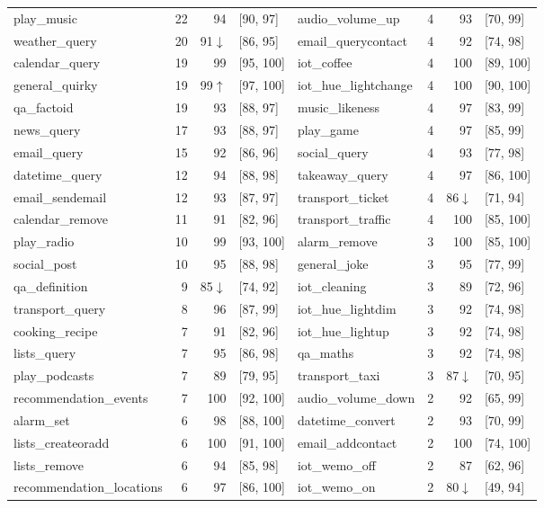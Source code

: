 \begin{tabular}{lrrl|lrrl}
play\_music & 22 & 94 & [90, 97] & audio\_volume\_up & 4 & 93 & [70, 99] \\
weather\_query & 20 & 91$\downarrow$ & [86, 95] & email\_querycontact & 4 & 92 & [74, 98] \\
calendar\_query & 19 & 99 & [95, 100] & iot\_coffee & 4 & 100 & [89, 100] \\
general\_quirky & 19 & 99$\uparrow$ & [97, 100] & iot\_hue\_lightchange & 4 & 100 & [90, 100] \\
qa\_factoid & 19 & 93 & [88, 97] & music\_likeness & 4 & 97 & [83, 99] \\
news\_query & 17 & 93 & [88, 97] & play\_game & 4 & 97 & [85, 99] \\
email\_query & 15 & 92 & [86, 96] & social\_query & 4 & 93 & [77, 98] \\
datetime\_query & 12 & 94 & [88, 98] & takeaway\_query & 4 & 97 & [86, 100] \\
email\_sendemail & 12 & 93 & [87, 97] & transport\_ticket & 4 & 86$\downarrow$ & [71, 94] \\
calendar\_remove & 11 & 91 & [82, 96] & transport\_traffic & 4 & 100 & [85, 100] \\
play\_radio & 10 & 99 & [93, 100] & alarm\_remove & 3 & 100 & [85, 100] \\
social\_post & 10 & 95 & [88, 98] & general\_joke & 3 & 95 & [77, 99] \\
qa\_definition & 9 & 85$\downarrow$ & [74, 92] & iot\_cleaning & 3 & 89 & [72, 96] \\
transport\_query & 8 & 96 & [87, 99] & iot\_hue\_lightdim & 3 & 92 & [74, 98] \\
cooking\_recipe & 7 & 91 & [82, 96] & iot\_hue\_lightup & 3 & 92 & [74, 98] \\
lists\_query & 7 & 95 & [86, 98] & qa\_maths & 3 & 92 & [74, 98] \\
play\_podcasts & 7 & 89 & [79, 95] & transport\_taxi & 3 & 87$\downarrow$ & [70, 95] \\
recommendation\_events & 7 & 100 & [92, 100] & audio\_volume\_down & 2 & 92 & [65, 99] \\
alarm\_set & 6 & 98 & [88, 100] & datetime\_convert & 2 & 93 & [70, 99] \\
lists\_createoradd & 6 & 100 & [91, 100] & email\_addcontact & 2 & 100 & [74, 100] \\
lists\_remove & 6 & 94 & [85, 98] & iot\_wemo\_off & 2 & 87 & [62, 96] \\
recommendation\_locations & 6 & 97 & [86, 100] & iot\_wemo\_on & 2 & 80$\downarrow$ & [49, 94] \\

\end{tabular}
